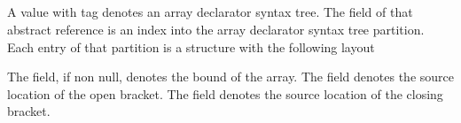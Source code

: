 \subsection{}
\label{sec:ifc:SyntaxSort:ArrayDeclarator}

A  value with tag  denotes an array declarator syntax tree.
The  field of that abstract reference is an index into the array declarator syntax tree partition.
Each entry of that partition is a structure with the following layout
%
\begin{figure}[H]
	\centering
	\label{fig:ifc:SyntaxSort:ArrayDeclarator}
\end{figure}
%
The  field, if non null, denotes the bound of the array.
The  field denotes the source location of the open bracket.
The  field denotes the source location of the closing bracket.


\subsection{}
\label{sec:ifc:SyntaxSort:FunctionDeclarator}


